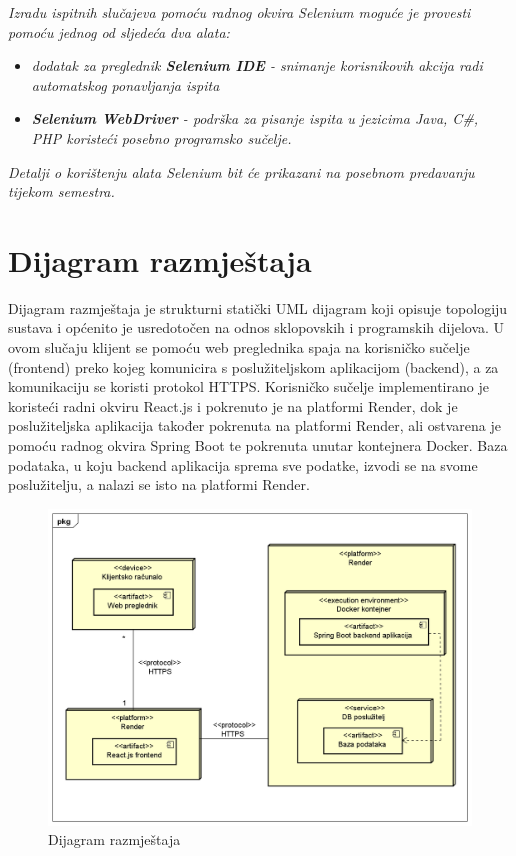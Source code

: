 			 \textit{Izradu ispitnih slučajeva pomoću radnog okvira Selenium moguće je provesti pomoću jednog od sljedeća dva alata:}
			 \begin{itemize}
			 	\item \textit{dodatak za preglednik \textbf{Selenium IDE} - snimanje korisnikovih akcija radi automatskog ponavljanja ispita	}
			 	\item \textit{\textbf{Selenium WebDriver} - podrška za pisanje ispita u jezicima Java, C\#, PHP koristeći posebno programsko sučelje.}
			 \end{itemize}
		 	\textit{Detalji o korištenju alata Selenium bit će prikazani na posebnom predavanju tijekom semestra.}
			
			\eject 
		
		
		\section{Dijagram razmještaja}
			
			Dijagram razmještaja je strukturni statički UML dijagram koji opisuje topologiju sustava i općenito je usredotočen na odnos sklopovskih i programskih dijelova. U ovom slučaju klijent se pomoću web preglednika spaja na korisničko sučelje (frontend) preko kojeg komunicira s poslužiteljskom aplikacijom (backend), a za komunikaciju se koristi protokol HTTPS. Korisničko sučelje  implementirano je koristeći radni okviru React.js i pokrenuto je na platformi Render, dok je poslužiteljska aplikacija također pokrenuta na platformi Render, ali ostvarena je pomoću radnog okvira Spring Boot te pokrenuta unutar kontejnera Docker. Baza podataka, u koju backend aplikacija sprema sve podatke, izvodi se na svome poslužitelju, a nalazi se isto na platformi Render.
			
			\begin{figure}[H]
				\includegraphics[width=\textwidth]{dijagrami/DeploymentDiagram.PNG} 
				\caption{Dijagram razmještaja}
				\label{fig:DeploymentDiagram}
			\end{figure}
			

